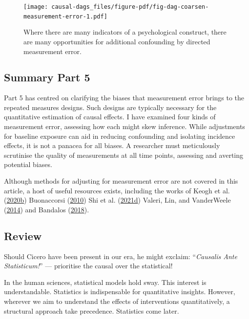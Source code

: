 \documentclass[
  singlecolumn]{report}
\begin{document}
\begin{figure}

{\centering \texttt{[image: causal-dags\_files/figure-pdf/fig-dag-coarsen-measurement-error-1.pdf]}

}

\caption{\label{fig-dag-coarsen-measurement-error}Where there are many
indicators of a psychological construct, there are many opportunities
for additional confounding by directed measurement error.}

\end{figure}

\hypertarget{summary-part-5}{%
\subsection{Summary Part 5}\label{summary-part-5}}

Part 5 has centred on clarifying the biases that measurement error
brings to the repeated measures designs. Such designs are typically
necessary for the quantitative estimation of causal effects. I have
examined four kinds of measurement error, assessing how each might skew
inference. While adjustments for baseline exposure can aid in reducing
confounding and isolating incidence effects, it is not a panacea for all
biases. A researcher must meticulously scrutinise the quality of
measurements at all time points, assessing and averting potential
biases.

Although methods for adjusting for measurement error are not covered in
this article, a host of useful resources exists, including the works of
Keogh et al. (\protect\hyperlink{ref-keogh2020}{2020b}) Buonaccorsi
(\protect\hyperlink{ref-buonaccorsi2010}{2010}) Shi et al.
(\protect\hyperlink{ref-shi2021b}{2021d}) Valeri, Lin, and VanderWeele
(\protect\hyperlink{ref-valeri2014}{2014}) and Bandalos
(\protect\hyperlink{ref-bandalos2018}{2018}).

\hypertarget{review}{%
\subsection{Review}\label{review}}

Should Cicero have been present in our era, he might exclaim:
``\emph{Causalis Ante Statisticum!}'' --- prioritise the causal over the
statistical!

In the human sciences, statistical models hold sway. This interest is
understandable. Statistics is indispensable for quantitative insights.
However, wherever we aim to understand the effects of interventions
quantitatively, a structural approach take precedence. Statistics come
later.
\end{document}
